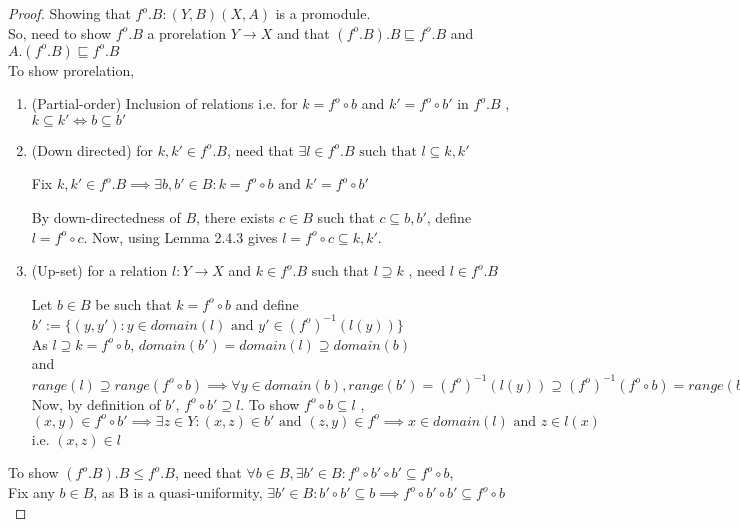 \documentclass[18pt,a4paper]{article}
\makeatletter
\theoremstyle{definition}
\newcommand{\carrow}{}%
\DeclareRobustCommand{\carrow}{%
	\mathrel{\vphantom{\rightarrow}\mathpalette\circle@arrow\relax}%
}
\newcommand{\circle@arrow}[2]{%
	\m@th
	\ooalign{%
		\hidewidth$#1\circ\mkern1mu$\hidewidth\cr
	$#1\longrightarrow$\cr}%
}
\makeatother
\begin{document}
\begin{proof}\setcounter{equation}{0}

Showing that $f^o .B: (Y,B) \carrow (X,A)$ is a promodule.\\
	So, need to show $f^o .B$ a prorelation $Y \to X$
	and that $(f^o .B).B \sqsubseteq f^o .B$ and $A.(f^o .B) \sqsubseteq f^o .B$ \\
	To show prorelation, \begin{enumerate}[label=(\roman*)]
		\item (Partial-order) Inclusion of relations i.e. for $k=f^o \circ b$ and
			$k'=f^o \circ b'$ in $f^o .B$ , $k \subseteq k' \iff b \subseteq b'$
		\item (Down directed) for $k,k' \in f^o .B$, need that $\exists l \in f^o .B
			\text{ such that } l \subseteq k,k'$

			Fix $k,k' \in f^o .B \implies \exists b,b' \in B : k=f^o \circ b \text{ and }
			k' = f^o \circ b'$

			By down-directedness of $B$, there exists $c \in B$ such that
			$ c \subseteq b,b'$, define $l=f^o \circ c$.
			Now, using Lemma 2.4.3 gives  $l= f^o \circ c \subseteq k,k'$.
		\item (Up-set) for a relation $l:Y \to X$ and $k \in f^o .B$ such that $l \supseteq k$
			, need $l \in f^o .B$

			Let $b\in B$ be such that $k=f^o \circ b$ and define
			$b':=\{(y,y'): y \in domain(l) \text{ and } y' \in (f^o)^{-1}(l(y))\}$\\
				As $l\supseteq k=f^o \circ b$, $domain(b')=domain(l)\supseteq domain(b)$
				\\ and $range(l) \supseteq range(f^o \circ b)\implies
				\forall y \in domain(b), range (b')=(f^o )^{-1}(l(y)) \supseteq (f^o)^{-1}(f^o \circ b ) = range(b)$\\
				Now, by definition of $b'$, $f^o \circ b' \supseteq l$. To show
				$f^o \circ b \subseteq l$ , \\
				$(x,y)\in f^o \circ b' \implies \exists z \in Y: (x,z)\in b' \text{ and }
				(z,y) \in f^o \implies x \in domain(l) \text{ and } z \in l(x)$ i.e.
				$(x,z) \in l$

		\end{enumerate}
	\item	To show $(f^o .B).B \leq f^o .B$, need that $\forall b \in B,
		\exists b' \in B : f^o \circ b' \circ b' \subseteq f^o \circ b$,\\
		Fix any $b \in B$, as B is a quasi-uniformity, $\exists b' \in B : b' \circ b' \subseteq b
		\implies f^o \circ b'\circ b' \subseteq f^o \circ b$


\end{proof}
\end{document}
